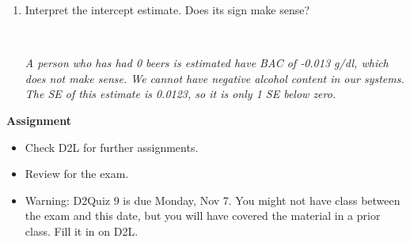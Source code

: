 \begin{enumerate}
\begin{enumerate}
\begin{key}
  {\it Each beer a person drinks is estimated to increase BAC by 0.018 g/dl}
\end{key}

\item Interpret the intercept estimate. Does its sign make sense?
\begin{students}
 \vspace{2cm}\\
\end{students}

\begin{key}
  {\it A person who has had 0 beers is estimated have BAC of -0.013
    g/dl, which does not make sense. We cannot have negative alcohol
    content in our systems. The SE of this estimate is 0.0123, so it
    is only 1 SE below zero.}
\end{key}
\end{enumerate}\vspace*{\fill}




\end{enumerate}




\noindent
{\bf Assignment} \vspace{-.2in}
\begin{itemize}
\item Check D2L for further assignments. 
\item Review for the exam.
\item Warning: D2Quiz 9 is due Monday, Nov 7. You might not have class
  between the exam and this date, but you will have covered the
  material in a prior class.  Fill it in on D2L.
\end{itemize}


  
 